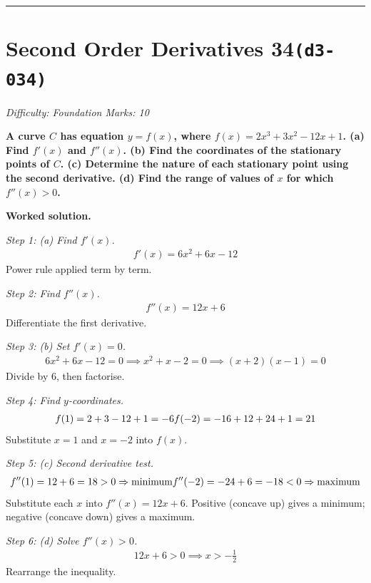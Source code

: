 \documentclass[11pt]{article}
\newcommand{\question}[1]{\par\medskip\noindent\textbf{#1}\par}
\begin{document}
\medskip\hrule

\section*{Second Order Derivatives 34\quad\small\texttt{(d3-034)}}
\textit{Difficulty: Foundation \quad\textbar\quad Marks: 10}

\question{A curve \( C \) has equation \( y = f(x) \), where \( f(x) = 2x^3 + 3x^2 - 12x + 1 \). (a) Find \( f'(x) \) and \( f''(x) \). (b) Find the coordinates of the stationary points of \( C \). (c) Determine the nature of each stationary point using the second derivative. (d) Find the range of values of \( x \) for which \( f''(x) > 0 \).}

\textbf{Worked solution.}

\textit{Step 1: (a) Find \( f'(x) \).}
\[\begin{gathered}
f'(x) = 6x^2 + 6x - 12
\end{gathered}\]
Power rule applied term by term.

\textit{Step 2: Find \( f''(x) \).}
\[\begin{gathered}
f''(x) = 12x + 6
\end{gathered}\]
Differentiate the first derivative.

\textit{Step 3: (b) Set \( f'(x) = 0 \).}
\[\begin{gathered}
6x^2 + 6x - 12 = 0 \implies x^2 + x - 2 = 0 \implies (x+2)(x-1) = 0
\end{gathered}\]
Divide by 6, then factorise.

\textit{Step 4: Find \( y \)-coordinates.}
\[\begin{gathered}
f(1) = 2 + 3 - 12 + 1 = -6 \newline f(-2) = -16 + 12 + 24 + 1 = 21
\end{gathered}\]
Substitute \( x = 1 \) and \( x = -2 \) into \( f(x) \).

\textit{Step 5: (c) Second derivative test.}
\[\begin{gathered}
f''(1) = 12 + 6 = 18 > 0 \Rightarrow \text{minimum} \newline f''(-2) = -24 + 6 = -18 < 0 \Rightarrow \text{maximum}
\end{gathered}\]
Substitute each \( x \) into \( f''(x) = 12x + 6 \). Positive (concave up) gives a minimum; negative (concave down) gives a maximum.

\textit{Step 6: (d) Solve \( f''(x) > 0 \).}
\[\begin{gathered}
12x + 6 > 0 \implies x > -\tfrac{1}{2}
\end{gathered}\]
Rearrange the inequality.
\end{document}
